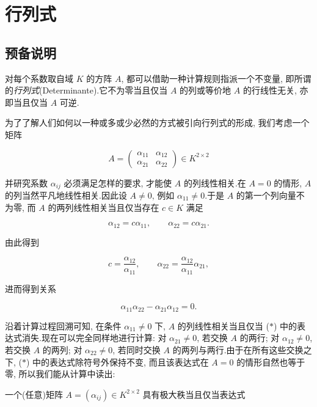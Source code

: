 \chapter{行列式}

\section*{预备说明}

对每个系数取自域 $K$ 的方阵 $A$, 都可以借助一种计算规则指派一个不变量, 即所谓的\emph{行列式}(\textup{Determinante}).它不为零当且仅当 $A$ 的列或等价地 $A$ 的行线性无关, 亦即当且仅当 $A$ 可逆.

为了了解人们如何以一种或多或少必然的方式被引向行列式的形成, 我们考虑一个矩阵

\[
A = \begin{pmatrix} \alpha_{11} & \alpha_{12} \\ \alpha_{21} & \alpha_{22} \end{pmatrix} \in K^{2 \times 2}
\]

并研究系数 $\alpha_{ij}$ 必须满足怎样的要求, 才能使 $A$ 的列线性相关.在 $A = 0$ 的情形, $A$ 的列当然平凡地线性相关.因此设 $A \neq 0$, 例如 $\alpha_{11} \neq 0$.于是 $A$ 的第一个列向量不为零, 而 $A$ 的两列线性相关当且仅当存在 $c \in K$ 满足

\[
\alpha_{12} = c \alpha_{11}, \qquad \alpha_{22} = c \alpha_{21}.
\]

由此得到

\[
c = \frac{\alpha_{12}}{\alpha_{11}}, \qquad \alpha_{22} = \frac{\alpha_{12}}{\alpha_{11}} \alpha_{21},
\]

进而得到关系

\begin{equation}
\alpha_{11} \alpha_{22} - \alpha_{21} \alpha_{12} = 0. \tag{$\ast$}
\end{equation}

沿着计算过程回溯可知, 在条件 $\alpha_{11} \neq 0$ 下, $A$ 的列线性相关当且仅当 ($\ast$) 中的表达式消失.现在可以完全同样地进行计算: 对 $\alpha_{21} \neq 0$, 若交换 $A$ 的两行; 对 $\alpha_{12} \neq 0$, 若交换 $A$ 的两列; 对 $\alpha_{22} \neq 0$, 若同时交换 $A$ 的两列与两行.由于在所有这些交换之下, ($\ast$) 中的表达式除符号外保持不变, 而且该表达式在 $A = 0$ 的情形自然也等于零, 所以我们能从计算中读出:

一个(任意)矩阵 $A = (\alpha_{ij}) \in K^{2 \times 2}$ 具有极大秩当且仅当表达式

